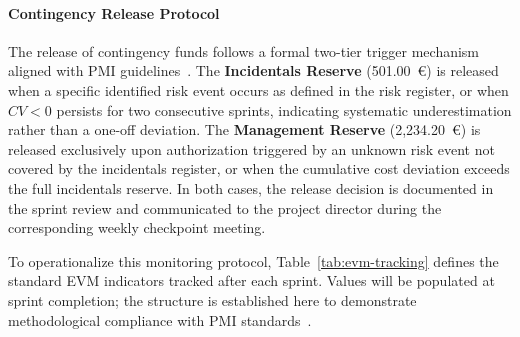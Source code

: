 \paragraph{Contingency Release Protocol}
The release of contingency funds follows a formal two-tier trigger
mechanism aligned with PMI guidelines~\cite{pmbok_guide}. The
\textbf{Incidentals Reserve} (501.00~\euro) is released when a specific
identified risk event occurs as defined in the risk register, or when
$CV < 0$ persists for two consecutive sprints, indicating systematic
underestimation rather than a one-off deviation. The
\textbf{Management Reserve} (2,234.20~\euro) is released exclusively upon
authorization triggered by an unknown risk event not covered by the
incidentals register, or when the cumulative cost deviation exceeds the
full incidentals reserve. In both cases, the release decision is
documented in the sprint review and communicated to the project director
during the corresponding weekly checkpoint meeting.

To operationalize this monitoring protocol, Table~\ref{tab:evm-tracking}
defines the standard EVM indicators tracked after each sprint. Values will
be populated at sprint completion; the structure is established here to
demonstrate methodological compliance with PMI standards~\cite{pmbok_guide}.

